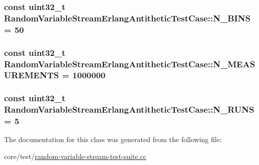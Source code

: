 \subsubsection[{\texorpdfstring{N\+\_\+\+B\+I\+NS}{N_BINS}}]{\setlength{\rightskip}{0pt plus 5cm}const uint32\+\_\+t Random\+Variable\+Stream\+Erlang\+Antithetic\+Test\+Case\+::\+N\+\_\+\+B\+I\+NS = 50\hspace{0.3cm}{\ttfamily [static]}}\hypertarget{classRandomVariableStreamErlangAntitheticTestCase_aa820bbab5f96c340175484666f90e156}{}\label{classRandomVariableStreamErlangAntitheticTestCase_aa820bbab5f96c340175484666f90e156}
\subsubsection[{\texorpdfstring{N\+\_\+\+M\+E\+A\+S\+U\+R\+E\+M\+E\+N\+TS}{N_MEASUREMENTS}}]{\setlength{\rightskip}{0pt plus 5cm}const uint32\+\_\+t Random\+Variable\+Stream\+Erlang\+Antithetic\+Test\+Case\+::\+N\+\_\+\+M\+E\+A\+S\+U\+R\+E\+M\+E\+N\+TS = 1000000\hspace{0.3cm}{\ttfamily [static]}}\hypertarget{classRandomVariableStreamErlangAntitheticTestCase_abcfab6f7ba6ed16802e3505c2c023c79}{}\label{classRandomVariableStreamErlangAntitheticTestCase_abcfab6f7ba6ed16802e3505c2c023c79}
\subsubsection[{\texorpdfstring{N\+\_\+\+R\+U\+NS}{N_RUNS}}]{\setlength{\rightskip}{0pt plus 5cm}const uint32\+\_\+t Random\+Variable\+Stream\+Erlang\+Antithetic\+Test\+Case\+::\+N\+\_\+\+R\+U\+NS = 5\hspace{0.3cm}{\ttfamily [static]}}\hypertarget{classRandomVariableStreamErlangAntitheticTestCase_a8100d0fc6db67c589316e1f5fea966bd}{}\label{classRandomVariableStreamErlangAntitheticTestCase_a8100d0fc6db67c589316e1f5fea966bd}


The documentation for this class was generated from the following file\+:\begin{DoxyCompactItemize}
\item 
core/test/\hyperlink{random-variable-stream-test-suite_8cc}{random-\/variable-\/stream-\/test-\/suite.\+cc}\end{DoxyCompactItemize}
